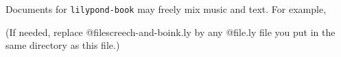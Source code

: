 \documentclass[a5paper]{article}
\begin{document}
Documents for \verb+lilypond-book+ may freely mix music and text.
For example,

(If needed, replace @file{screech-and-boink.ly} by any @file{.ly} file
you put in the same directory as this file.)
\end{document}
